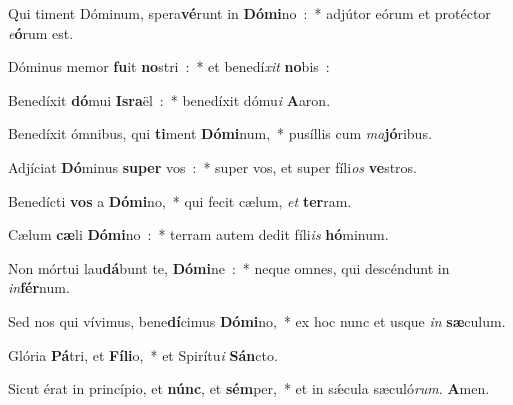 \item Qui timent Dóminum, spera\textbf{vé}\-runt in \textbf{Dó}\-\textbf{mi}\-no~:~* adjútor eórum et protéctor \emph{e}\-\textbf{ó}\-rum est.
\item Dóminus memor \textbf{fu}\-it \textbf{no}\-stri~:~* et benedí\emph{xit} \textbf{no}bis~:
\item Benedíxit \textbf{dó}\-mui \textbf{Is}\-\textbf{ra}\-ël~:~* benedíxit dómu\emph{i} \textbf{A}aron.
\item Benedíxit ómnibus, qui \textbf{ti}\-ment \textbf{Dó}\-\textbf{mi}\-num,~* pusíllis cum \emph{ma}\textbf{jó}ribus.
\item Adjíciat \textbf{Dó}\-minus \textbf{su}\-\textbf{per} vos~:~* super vos, et super fí\-li\-\emph{os} \textbf{ve}stros.
\item Benedícti \textbf{vos} a \textbf{Dó}\-\textbf{mi}\-no,~* qui fecit cælum, \emph{et} \textbf{ter}ram.
\item Cælum \textbf{cæ}\-li \textbf{Dó}\-\textbf{mi}\-no~:~* terram autem dedit fíli\emph{is} \textbf{hó}minum.
\item Non mórtui lau\textbf{dá}\-bunt te, \textbf{Dó}\-\textbf{mi}\-ne~:~* neque omnes, qui descéndunt in \emph{in}\textbf{fér}num.
\item Sed nos qui vívimus, bene\textbf{dí}\-cimus \textbf{Dó}\-\textbf{mi}\-no,~* ex hoc nunc et usque \emph{in} \textbf{sæ}culum.
\item Glória \textbf{Pá}\-tri, et \textbf{Fí}\-\textbf{li}\-o,~* et Spirítu\emph{i} \textbf{Sán}cto.
\item Sicut érat in princípio, et \textbf{núnc}, et \textbf{sém}\-per,~* et in sǽcula sæculó\emph{rum}. \textbf{A}men.
